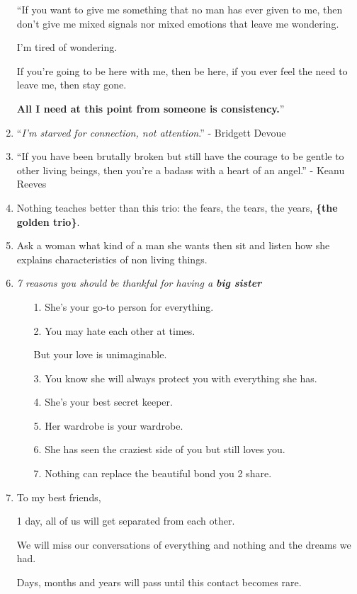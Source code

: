 \documentclass{article}
\numberwithin{equation}{section}
\begin{document}
\begin{enumerate}
    ``If you want to give me something that no man has ever given to me, then don't give me mixed signals nor mixed emotions that leave me wondering.
    
    I'm tired of wondering.
    
    If you're going to be here with me, then be here, if you ever feel the need to leave me, then stay gone.
    
    \textbf{All I need at this point from someone is consistency.}''
    \item ``\textit{I'm starved for connection, not attention}.'' - Bridgett Devoue
    \item ``If you have been brutally broken but still have the courage to be gentle to other living beings, then you're a badass with a heart of an angel.'' - Keanu Reeves
    \item Nothing teaches better than this trio: the fears, the tears, the years, \textbf{\{the golden trio\}}.
    \item Ask a woman what kind of a man she wants then sit and listen how she explains characteristics of non living things.
    \item \textit{7 reasons you should be thankful for having a \textbf{big sister}}
    \begin{itemize}
        \item[1.] She's your go-to person for everything.
        \item[2.] You may hate each other at times.
        
        But your love is unimaginable.
        \item[3.] You know she will always protect you with everything she has.
        \item[4.] She's your best secret keeper.
        \item[5.] Her wardrobe is your wardrobe.
        \item[6.] She has seen the craziest side of you but still loves you.
        \item[7.] Nothing can replace the beautiful bond you 2 share.
    \end{itemize}
    \item To my best friends,
    
    1 day, all of us will get separated from each other.
    
    We will miss our conversations of everything and nothing and the dreams we had.
    
    Days, months and years will pass until this contact becomes rare.
    

\end{enumerate}
\end{document}
